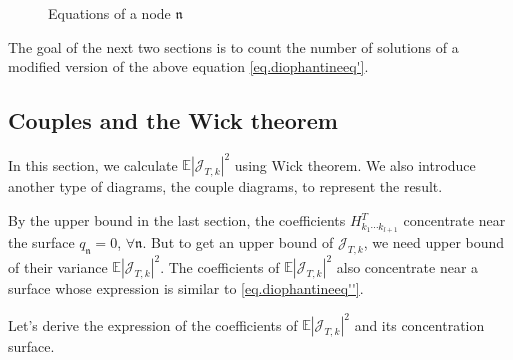 \begin{figure}[H]
    \centering
        \caption{Equations of a node $\mathfrak{n}$}
        \label{fig.equations}
    \end{figure}
    

The goal of the next two sections is to count the number of solutions of a modified version of the above equation \eqref{eq.diophantineeq'}. 

\subsection{Couples and the Wick theorem}\label{sec.coupwick} In this section, we calculate $\mathbb{E}|\mathcal{J}_{T,k}|^2$ using Wick theorem. We also introduce another type of diagrams, the couple diagrams, to represent the result.

By the upper bound in the last section, the coefficients $H^T_{k_1\cdots k_{l+1}}$ concentrate near the surface $q_{\mathfrak{n}}=0$, $\forall \mathfrak{n}$. But to get an upper bound of $\mathcal{J}_{T,k}$, we need upper bound of their variance $\mathbb{E}|\mathcal{J}_{T,k}|^2$. The coefficients of $\mathbb{E}|\mathcal{J}_{T,k}|^2$ also concentrate near a surface whose expression is similar to \eqref{eq.diophantineeq''}. 

Let's derive the expression of the coefficients of $\mathbb{E}|\mathcal{J}_{T,k}|^2$ and its concentration surface.

